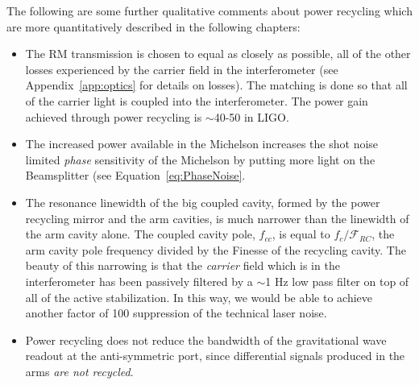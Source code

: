 The following are some further qualitative comments about power recycling which
are more quantitatively described in the following chapters:

\begin{itemize}

\item The RM transmission is chosen to equal as closely as possible, all of the
      other losses experienced by the carrier field in the interferometer (see
      Appendix~\ref{app:optics} for details on losses). 
      The matching is done so that all of the carrier light is coupled into
      the interferometer. The power gain achieved through power recycling is
      $\sim$40-50 in LIGO.

\item The increased power available in the Michelson increases the shot noise 
      limited \emph{phase} sensitivity of the Michelson 
      by putting more light on the Beamsplitter (see Equation~\ref{eq:PhaseNoise}. 

\item The resonance linewidth of the big coupled cavity, formed by the power recycling
      mirror and the arm cavities, is much narrower than the linewidth of the
      arm cavity alone. The coupled cavity pole, $f_{cc}$, is equal to
      $f_c / \mathcal{F}_{RC}$, the arm cavity pole frequency divided by the 
      Finesse of the recycling cavity.
      The beauty of this narrowing is that the \emph{carrier} field which is in the 
      interferometer has been passively filtered by a $\sim$1 Hz low pass filter on 
      top of all of the active stabilization. In this way, we would be able to
      achieve another factor of 100 suppression of the technical laser noise.

\item Power recycling does not reduce the bandwidth of the gravitational wave readout
      at the anti-symmetric port, since differential signals produced in the
      arms \emph{are not recycled}.

\end{itemize}






